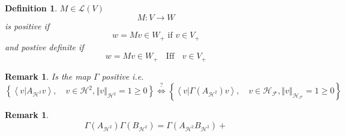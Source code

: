 \documentclass[aps,preprint]{revtex4}%
\newtheorem{definition}[theorem]{Definition}
\newtheorem{remark}[theorem]{Remark}
\begin{document}
\begin{definition}
$M\in\mathcal{L}\left(  V\right)  $
\begin{equation}
M:V\rightarrow W
\end{equation}
is positive if
\begin{equation}
w=Mv\in W_{+}\text{ if }v\in V_{+}%
\end{equation}
and postive definite if
\begin{equation}
w=Mv\in W_{+}\text{ }\operatorname*{Iff}\text{ }v\in V_{+}%
\end{equation}

\end{definition}

\begin{remark}
Is the map $\Gamma$ positive i.e.
\begin{equation}
\left\{  \left\langle \left.  v\right\vert A_{\mathcal{H}^{2}}v\right\rangle
,\quad v\in\mathcal{H}^{2},\left\Vert v\right\Vert _{\mathcal{H}^{2}}%
=1\geq0\right\}  \overset{?}{\Leftrightarrow}\left\{  \left\langle \left.
v\right\vert \Gamma\left(  A_{\mathcal{H}^{2}}\right)  v\right\rangle ,\quad
v\in\mathcal{H}_{\mathcal{F}},\left\Vert v\right\Vert _{\mathcal{H}%
_{\mathcal{F}}}=1\geq0\right\}
\end{equation}

\end{remark}

\begin{remark}%
\begin{equation}
\Gamma\left(  A_{\mathcal{H}^{2}}\right)  \Gamma\left(  B_{\mathcal{H}^{2}%
}\right)  =\Gamma\left(  A_{\mathcal{H}^{2}}B_{\mathcal{H}^{2}}\right)  +
\end{equation}

\end{remark}
\end{document}

